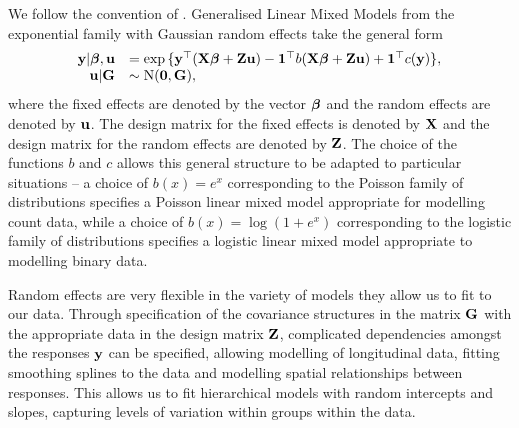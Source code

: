 We follow the convention of \citep{Zhao2006}. Generalised Linear Mixed Models from the exponential family with
Gaussian random effects take the general form
$$
\begin{array}{rl}
	{\bf y} | {\boldsymbol \beta}, {\bf u} &= \exp{\{ {\bf y}^\top ({\bf X}{\boldsymbol\beta}+ {\bf Z}{\bf u}) - {\bf1}^\top b({\bf X}{\boldsymbol\beta}+ {\bf Z}{\bf u}) + {\bf1}^\top c({\bf y}) \}}, \\
	{\bf u} | {\bf G} &\sim \text{N}({\bf 0}, {\bf G}),
\end{array}
$$
where the fixed effects are denoted by the vector ${\boldsymbol \beta}$ and the random effects are denoted by ${\bf u}$. The
design matrix for the fixed effects is denoted by ${\bf X}$ and the design matrix for the random effects are
denoted by ${\bf Z}$. The choice of the functions $b$ and $c$ allows this general structure to be adapted to
particular situations -- a choice of $b(x) = e^x$ corresponding to the Poisson family of distributions
specifies a Poisson linear mixed model appropriate for modelling count data, while a choice of $b(x) = \log(1
+ e^x)$ corresponding to the logistic family of distributions specifies a logistic linear mixed model
appropriate to modelling binary data.

Random effects are very flexible in the variety of models they allow us to fit to our data. Through
specification of the covariance structures in the matrix ${\bf G}$ with the appropriate data in the design matrix
${\bf Z}$, complicated dependencies amongst the responses ${\bf y}$ can be specified, allowing modelling of
longitudinal data, fitting smoothing splines to the data and modelling spatial relationships between
responses. This allows us to fit hierarchical models with random intercepts and slopes, capturing levels of variation within groups within the data.
\citep{Gelman2007}

